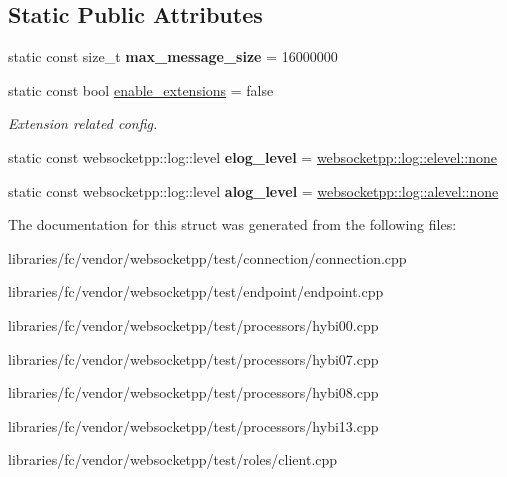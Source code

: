 \subsection*{Static Public Attributes}
\begin{DoxyCompactItemize}
\item 
\mbox{\label{structstub__config_af3bff8827bb7bc7b89bff020d6a1fa67}} 
static const size\+\_\+t {\bfseries max\+\_\+message\+\_\+size} = 16000000
\item 
\mbox{\label{structstub__config_a10cfb6ee6ff233ac4581d3201a324684}} 
static const bool \mbox{\hyperlink{structstub__config_a10cfb6ee6ff233ac4581d3201a324684}{enable\+\_\+extensions}} = false
\begin{DoxyCompactList}\small\item\em Extension related config. \end{DoxyCompactList}\item 
\mbox{\label{structstub__config_ac5b2f2f262b0cb3ba69bc1dc39b3d251}} 
static const websocketpp\+::log\+::level {\bfseries elog\+\_\+level} = \mbox{\hyperlink{structwebsocketpp_1_1log_1_1elevel_ae86395aa26ec2089e07fd63b62a549fa}{websocketpp\+::log\+::elevel\+::none}}
\item 
\mbox{\label{structstub__config_a65beba835b80790d444437f56c4420f0}} 
static const websocketpp\+::log\+::level {\bfseries alog\+\_\+level} = \mbox{\hyperlink{structwebsocketpp_1_1log_1_1alevel_a4cf0520816094999975fe73081cf30f2}{websocketpp\+::log\+::alevel\+::none}}
\end{DoxyCompactItemize}


The documentation for this struct was generated from the following files\+:\begin{DoxyCompactItemize}
\item 
libraries/fc/vendor/websocketpp/test/connection/connection.\+cpp\item 
libraries/fc/vendor/websocketpp/test/endpoint/endpoint.\+cpp\item 
libraries/fc/vendor/websocketpp/test/processors/hybi00.\+cpp\item 
libraries/fc/vendor/websocketpp/test/processors/hybi07.\+cpp\item 
libraries/fc/vendor/websocketpp/test/processors/hybi08.\+cpp\item 
libraries/fc/vendor/websocketpp/test/processors/hybi13.\+cpp\item 
libraries/fc/vendor/websocketpp/test/roles/client.\+cpp\end{DoxyCompactItemize}
